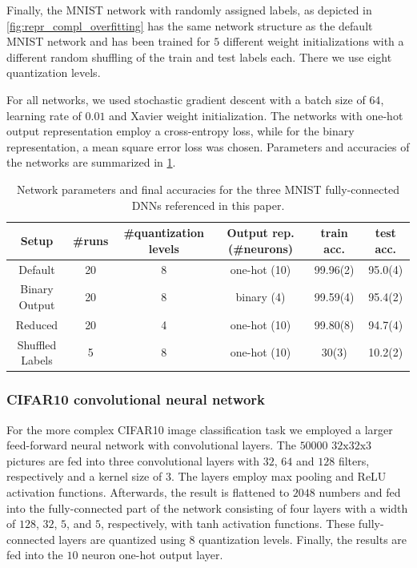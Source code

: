 \documentclass[10pt]{article}
\renewcommand\autoref[1]{\cref{#1}}
\theoremstyle{definition}
\theoremstyle{plain}
\begin{document}
Finally, the MNIST network with randomly assigned labels, as depicted in \autoref{fig:repr_compl_overfitting} has the same network structure as the default MNIST network and has been trained for $5$ different weight initializations with a different random shuffling of the train and test labels each. There we use eight quantization levels. 

For all networks, we used stochastic gradient descent with a batch size of $64$, learning rate of $0.01$ and Xavier weight initialization. The networks with one-hot output representation employ a cross-entropy loss, while for the binary representation, a mean square error loss was chosen. Parameters and accuracies of the networks are summarized in \autoref{tab:networks}.

\begin{table}[ht]
    \centering
    \begin{tabular}{c|c|c|c|c|c}
        Setup & \#runs & \#quantization levels & Output rep. (\#neurons) & train acc. & test acc.\\
        \hline
        Default & 20 & 8 & one-hot (10)&99.96(2)&95.0(4)\\
        Binary Output & 20 & 8 & binary (4)&99.59(4)&95.4(2)\\
        Reduced & 20 & 4 & one-hot (10)&99.80(8)&94.7(4) \\
        Shuffled Labels & 5 & 8 & one-hot (10) & 30(3) & 10.2(2)
        
    \end{tabular}
    \caption{Network parameters and final accuracies for the three MNIST fully-connected DNNs referenced in this paper.}
    \label{tab:networks}
\end{table}

\subsubsection{CIFAR10 convolutional neural network}

For the more complex CIFAR10 image classification task \citep{krizhevsky2009learning} we employed a larger feed-forward neural network with convolutional layers. The $50000$ $32\mathrm{x}32\mathrm{x}3$ pictures are fed into three convolutional layers with $32$, $64$ and $128$ filters, respectively and a kernel size of $3$. The layers employ max pooling and ReLU activation functions. Afterwards, the result is flattened to $2048$ numbers and fed into the fully-connected part of the network consisting of four layers with a width of $128$, $32$, $5$, and $5$, respectively, with tanh activation functions. These fully-connected layers are quantized using $8$ quantization levels. Finally, the results are fed into the $10$ neuron one-hot output layer.
\end{document}
